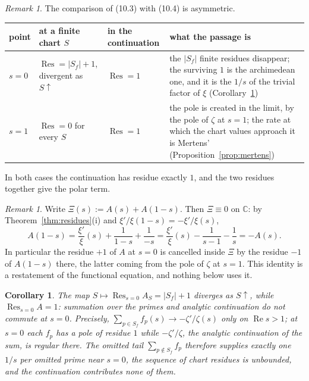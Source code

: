 \documentclass[11pt]{amsart}
\newtheorem{corollary}[theorem]{Corollary}
\theoremstyle{definition}
\theoremstyle{remark}
\newtheorem{remark}[theorem]{Remark}
\newcommand{\C}{\mathbb C}
\newcommand{\Rel}{\operatorname{Re}}
\newcommand{\Res}{\operatorname*{Res}}
\begin{document}
\begin{remark}
\label{rem:collapses}
The comparison of (10.3) with (10.4) is asymmetric.
\begin{center}
\begin{tabularx}{\textwidth}{@{}lllY@{}}
\toprule
point & at a finite chart $S$ & in the continuation & what the passage is\\
\midrule
$s=0$ & $\Res=|S_f|+1$, divergent as $S\uparrow$ & $\Res=1$ &
the $|S_f|$ finite residues disappear; the surviving $1$ is the archimedean
one, and it is the $1/s$ of the trivial factor of $\xi$
(Corollary~\ref{cor:noncommute})\\[2pt]
$s=1$ & $\Res=0$ for every $S$ & $\Res=1$ &
the pole is created in the limit, by the pole of $\zeta$ at $s=1$;
the rate at which the chart values approach it is Mertens'
(Proposition~\ref{prop:mertens})\\
\bottomrule
\end{tabularx}
\end{center}
In both cases the continuation has residue exactly $1$, and the two residues
together give the polar term.
\end{remark}

\begin{remark}
\label{rem:reflected}
Write $\Xi(s):=A(s)+A(1-s)$.  Then $\Xi\equiv0$ on $\C$: by
Theorem~\ref{thm:residues}(i) and $\xi'/\xi(1-s)=-\xi'/\xi(s)$,
\[
  A(1-s)=\frac{\xi'}{\xi}(s)+\frac1{1-s}+\frac1{-s}
        =\frac{\xi'}{\xi}(s)-\frac1{s-1}-\frac1s=-A(s).
\]
In particular the residue $+1$ of $A$ at $s=0$ is cancelled inside $\Xi$ by the
residue $-1$ of $A(1-s)$ there, the latter coming from the pole of $\zeta$ at
$s=1$.  This identity is a restatement of the functional equation, and
nothing below uses it.
\end{remark}

\begin{corollary}
\label{cor:noncommute}
The map $S\mapsto\Res_{s=0}A_S=|S_f|+1$ diverges as $S\uparrow$, while
$\Res_{s=0}A=1$: summation over the primes and analytic continuation do not
commute at $s=0$.  Precisely,
$\sum_{p\in S_f}f_p(s)\to-\zeta'/\zeta(s)$ only on $\Rel s>1$; at $s=0$ each
$f_p$ has a pole of residue $1$ while $-\zeta'/\zeta$, the analytic
continuation of the sum, is regular there.  The omitted tail
$\sum_{p\notin S_f}f_p$ therefore supplies exactly one $1/s$ per omitted prime
near $s=0$, the sequence of chart residues is unbounded, and the continuation
contributes none of them.
\end{corollary}
\end{document}
